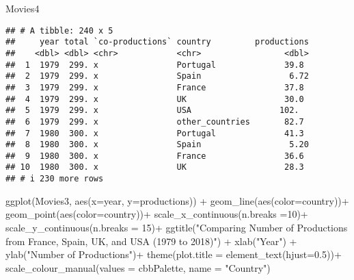 \documentclass[
]{article}
\newenvironment{Shaded}{\begin{snugshade}}{\end{snugshade}}
\newcommand{\AttributeTok}[1]{\textcolor[rgb]{0.77,0.63,0.00}{#1}}
\newcommand{\DecValTok}[1]{\textcolor[rgb]{0.00,0.00,0.81}{#1}}
\newcommand{\FloatTok}[1]{\textcolor[rgb]{0.00,0.00,0.81}{#1}}
\newcommand{\FunctionTok}[1]{\textcolor[rgb]{0.00,0.00,0.00}{#1}}
\newcommand{\NormalTok}[1]{#1}
\newcommand{\SpecialCharTok}[1]{\textcolor[rgb]{0.00,0.00,0.00}{#1}}
\newcommand{\StringTok}[1]{\textcolor[rgb]{0.31,0.60,0.02}{#1}}
\begin{document}
\begin{Shaded}
\begin{Highlighting}[]
\NormalTok{Movies4}
\end{Highlighting}
\end{Shaded}

\begin{verbatim}
## # A tibble: 240 x 5
##     year total `co-productions` country         productions
##    <dbl> <dbl> <chr>            <chr>                 <dbl>
##  1  1979  299. x                Portugal              39.8 
##  2  1979  299. x                Spain                  6.72
##  3  1979  299. x                France                37.8 
##  4  1979  299. x                UK                    30.0 
##  5  1979  299. x                USA                  102.  
##  6  1979  299. x                other_countries       82.7 
##  7  1980  300. x                Portugal              41.3 
##  8  1980  300. x                Spain                  5.20
##  9  1980  300. x                France                36.6 
## 10  1980  300. x                UK                    28.3 
## # i 230 more rows
\end{verbatim}

\begin{Shaded}
\begin{Highlighting}[]
\FunctionTok{ggplot}\NormalTok{(Movies3, }\FunctionTok{aes}\NormalTok{(}\AttributeTok{x=}\NormalTok{year, }\AttributeTok{y=}\NormalTok{productions)) }\SpecialCharTok{+} 
  \FunctionTok{geom\_line}\NormalTok{(}\FunctionTok{aes}\NormalTok{(}\AttributeTok{color=}\NormalTok{country))}\SpecialCharTok{+}
  \FunctionTok{geom\_point}\NormalTok{(}\FunctionTok{aes}\NormalTok{(}\AttributeTok{color=}\NormalTok{country))}\SpecialCharTok{+}
  \FunctionTok{scale\_x\_continuous}\NormalTok{(}\AttributeTok{n.breaks =}\DecValTok{10}\NormalTok{)}\SpecialCharTok{+}
  \FunctionTok{scale\_y\_continuous}\NormalTok{(}\AttributeTok{n.breaks =} \DecValTok{15}\NormalTok{)}\SpecialCharTok{+}
  \FunctionTok{ggtitle}\NormalTok{(}\StringTok{"Comparing Number of Productions from France, Spain, UK, and USA (1979 to 2018)"}\NormalTok{) }\SpecialCharTok{+}
  \FunctionTok{xlab}\NormalTok{(}\StringTok{"Year"}\NormalTok{) }\SpecialCharTok{+} 
  \FunctionTok{ylab}\NormalTok{(}\StringTok{"Number of Productions"}\NormalTok{)}\SpecialCharTok{+}
  \FunctionTok{theme}\NormalTok{(}\AttributeTok{plot.title =} \FunctionTok{element\_text}\NormalTok{(}\AttributeTok{hjust=}\FloatTok{0.5}\NormalTok{))}\SpecialCharTok{+}
  \FunctionTok{scale\_colour\_manual}\NormalTok{(}\AttributeTok{values =}\NormalTok{ cbbPalette, }\AttributeTok{name =} \StringTok{"Country"}\NormalTok{)}
\end{Highlighting}
\end{Shaded}
\end{document}
